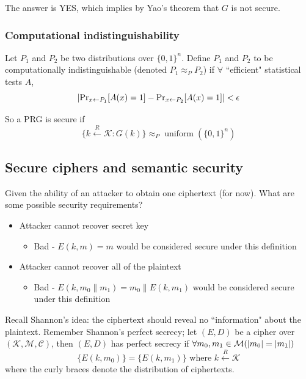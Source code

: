 \documentclass[10pt,a4paper]{report}
\begin{document}
The answer is YES, which implies by Yao's theorem that $G$ is not secure.

\subsubsection*{Computational indistinguishability}

Let $P_1$ and $P_2$ be two distributions over $\{0, 1\}^n$. Define $P_1$ and $P_2$ to be
computationally indistinguishable (denoted $P_1 \approx_P P_2$) if $\forall$ ``efficient"
statistical tests $A$,
    $$ \abs{\operatorname{Pr}_{x \leftarrow P_1}[A(x) = 1] - \operatorname{Pr}_{x \leftarrow
       P_2}[A(x) = 1]} < \epsilon $$

So a PRG is secure if
    $$ \{k \xleftarrow{R} \mathcal{K} \colon G(k)\} \approx_P \operatorname{uniform}(\{0, 1\}^n) $$

\subsection{Secure ciphers and semantic security}

Given the ability of an attacker to obtain one ciphertext (for now). What are some possible
security requirements?

\begin{itemize}
    \item Attacker cannot recover secret key
    \begin{itemize}
        \item Bad - $E(k, m) = m$ would be considered secure under this definition
    \end{itemize}
    \item Attacker cannot recover all of the plaintext
    \begin{itemize}
        \item Bad - $E(k, m_0 \parallel m_1) = m_0 \parallel E(k, m_1)$ would be considered secure
            under this definition
    \end{itemize}
\end{itemize}

Recall Shannon's idea: the ciphertext should reveal no ``information" about the plaintext. Remember
Shannon's perfect secrecy; let $(E, D)$ be a cipher over $(\mathcal{K}, \mathcal{M}, \mathcal{C})$,
then $(E, D)$ has perfect secrecy if $\forall m_0, m_1 \in \mathcal{M} (\abs{m_0} = \abs{m_1})$
    $$ \{E(k, m_0)\} = \{E(k, m_1)\} \text{ where } k \xleftarrow{R} \mathcal{K} $$
where the curly braces denote the distribution of ciphertexts.
\end{document}
